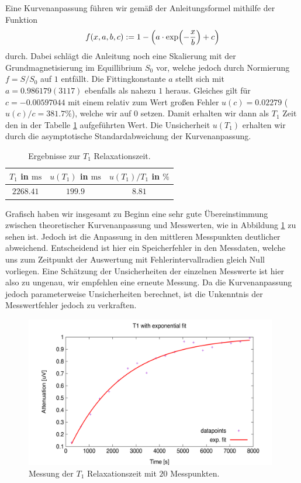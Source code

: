 \documentclass[../../main.tex]{subfiles}
\begin{document}
    Eine Kurvenanpassung führen wir gemäß der Anleitungsformel mithilfe der Funktion 
    \[
        f(x,a,b,c) := 1 - \left(a\cdot\exp(-\frac{x}{b}) + c\right)
    \]
    durch. Dabei schlägt die Anleitung noch eine Skalierung mit der Grundmagnetisierung im Equillibrium $S_0$ vor, welche jedoch durch Normierung $f = S/S_0$ auf $1$ entfällt. Die Fittingkonstante $a$ stellt sich mit $a = 0.986179(3117)$ ebenfalls als nahezu $1$ heraus. Gleiches gilt für $c = -0.00597044$ mit einem relativ zum Wert großen Fehler $u(c) = 0.02279$ ($u(c)/c = 381.7\si{\percent}$), welche wir auf $0$ setzen. Damit erhalten wir dann als $T_1$ Zeit den in der Tabelle \ref{tab:8:T1} aufgeführten Wert. Die Unsicherheit $u(T_1)$ erhalten wir durch die asymptotische Standardabweichung der Kurvenanpassung. 

    \begin{table}[H]
        \centering
        \begin{tabular}{c|cc}
            \hline
            $T_1$ in $\si{\ms}$ & $u(T_1)$ in $\si{\ms}$ & $u(T_1)/T_1$ in $\si{\percent}$ \\
            \hline\hline
            $2268.41$ & $199.9$ & $8.81$ \\
            \hline
        \end{tabular}
        \caption{Ergebnisse zur $T_1$ Relaxationszeit.}
        \label{tab:8:T1}
    \end{table}
    Grafisch haben wir insgesamt zu Beginn eine sehr gute Übereinstimmung zwischen theoretischer Kurvenanpassung und Messwerten, wie in Abbildung \ref{fig:8:T1-Bp-20steps_exp} zu sehen ist. Jedoch ist die Anpassung in den mittleren Messpunkten deutlicher abweichend. Entscheidend ist hier ein Speicherfehler in den Messdaten, welche uns zum Zeitpunkt der Auswertung mit Fehlerintervallradien gleich Null vorliegen. Eine Schätzung der Unsicherheiten der einzelnen Messwerte ist hier also zu ungenau, wir empfehlen eine erneute Messung. Da die Kurvenanpassung jedoch parameterweise Unsicherheiten berechnet, ist die Unkenntnis der Messwertfehler jedoch zu verkraften.
    \begin{figure}[H]
        \centering
        \includegraphics[width=11cm]{Bilddateien/8/T1-Bp-20steps_exp.png}
        \caption{Messung der $T_1$ Relaxationszeit mit $20$ Messpunkten.}
        \label{fig:8:T1-Bp-20steps_exp}
    \end{figure}
\end{document}

